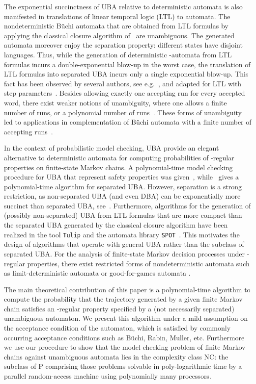 \documentclass{elsarticle}
\newcommand{\spot}{\texttt{SPOT}}
\newcommand{\tulip}{\texttt{Tulip}}
\begin{document}
The exponential succinctness of UBA relative to deterministic automata
is also manifested in translations of linear temporal logic
(LTL) to automata.  The nondeterministic B\"{u}chi automata that are
obtained from LTL formulas by applying the classical closure algorithm
of~\cite{WVS83,VardiWolper86} are unambiguous. The generated automata
moreover enjoy the separation property: different states
have disjoint languages.  Thus, while the generation of deterministic
-automata from LTL formulas incurs a double-exponential
blow-up in the worst case, the translation of LTL formulas into
separated UBA incurs only a single exponential blow-up. This fact has
been observed by several authors, see
e.g.~\cite{CouSahSut03,MorgensternThesis}, and adapted for LTL with
step parameters~\cite{Zimmermann13,ChaKat14}.
Besides allowing exactly one accepting run for every accepted word, there exist
weaker notions of unambiguity, where one allows a finite number of runs, or a
polynomial number of runs~\cite{RI89,HSS17}. These forms of unambiguity led to applications in
complementation of B\"uchi automata with a finite number of accepting runs~\cite{Rabinovich18}.



In the context of probabilistic model checking, UBA provide an elegant
alternative to deterministic automata for computing probabilities of
-regular properties on finite-state Markov chains.  A
polynomial-time model checking procedure for UBA that represent safety
properties was given~\cite{BenLenWor14}, while~\cite{CouSahSut03}
gives a polynomial-time algorithm for separated UBA.  However,
separation is a strong restriction, as non-separated UBA (and even
DBA) can be exponentially more succinct than separated UBA,
see~\cite{BousLoed10}.  Furthermore, algorithms for the generation of
(possibly non-separated) UBA from LTL formulas that are more compact
than the separated UBA generated by the classical closure algorithm
have been realized in the tool \tulip{}
\cite{LenhardtThesis13,Len-Tulip13} and the automata library
\spot{}~\cite{Duret13}.  This motivates the design of algorithms that
operate with general UBA rather than the subclass of separated UBA.
For the analysis of finite-state Markov decision processes under
-regular properties, there exist restricted forms of
nondeterministic automata such as limit-deterministic automata
\cite{Vardi85,CY95,SEJK16} or good-for-games automata
\cite{HP06,KMBK14}.

The main theoretical contribution of this paper is a polynomial-time
algorithm to compute the probability that the trajectory generated by
a given finite Markov chain satisfies an -regular property
specified by a (not necessarily separated) unambiguous automaton.  We
present this algorithm under a mild assumption on the acceptance
condition of the automaton, which is satisfied by commonly occurring
acceptance conditions such as B\"{u}chi, Rabin, Muller, etc.
Furthermore we use our procedure to show that the model checking
problem of finite Markov chains against unambiguous automata lies in
the complexity class NC: the subclass of P comprising those problems
solvable in poly-logarithmic time by a parallel random-access machine
using polynomially many processors.
\end{document}
